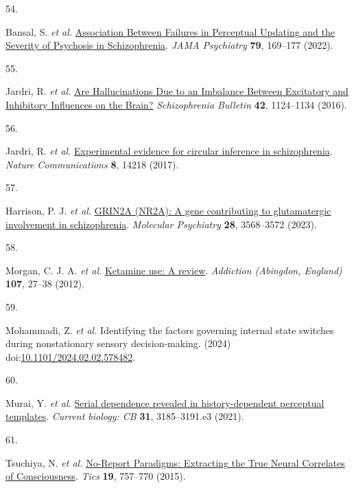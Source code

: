 \documentclass[
]{article}
\newlength{\cslhangindent}
\newlength{\csllabelwidth}
\newenvironment{CSLReferences}[2] %
 {\begin{list}{}{%
  \setlength{\itemindent}{0pt}
  \setlength{\leftmargin}{0pt}
  \setlength{\parsep}{0pt}
  \ifodd #1
   \setlength{\leftmargin}{\cslhangindent}
   \setlength{\itemindent}{-1\cslhangindent}
  \fi
  \setlength{\itemsep}{#2\baselineskip}}}
 {\end{list}}
\newcommand{\CSLLeftMargin}[1]{\parbox[t]{\csllabelwidth}{\strut#1\strut}}
\newcommand{\CSLRightInline}[1]{\parbox[t]{\linewidth - \csllabelwidth}{\strut#1\strut}}
\begin{document}
\begin{CSLReferences}{0}{0}
\CSLLeftMargin{54. }%
\CSLRightInline{Bansal, S. \emph{et al.}
\href{https://doi.org/10.1001/jamapsychiatry.2021.3482}{Association
{Between} {Failures} in {Perceptual} {Updating} and the {Severity} of
{Psychosis} in {Schizophrenia}}. \emph{JAMA Psychiatry} \textbf{79},
169--177 (2022).}

\CSLLeftMargin{55. }%
\CSLRightInline{Jardri, R. \emph{et al.}
\href{https://doi.org/10.1093/schbul/sbw075}{Are {Hallucinations} {Due}
to an {Imbalance} {Between} {Excitatory} and {Inhibitory} {Influences}
on the {Brain}?} \emph{Schizophrenia Bulletin} \textbf{42}, 1124--1134
(2016).}

\CSLLeftMargin{56. }%
\CSLRightInline{Jardri, R. \emph{et al.}
\href{https://doi.org/10.1038/ncomms14218}{Experimental evidence for
circular inference in schizophrenia}. \emph{Nature Communications}
\textbf{8}, 14218 (2017).}

\CSLLeftMargin{57. }%
\CSLRightInline{Harrison, P. J. \emph{et al.}
\href{https://doi.org/10.1038/s41380-023-02265-y}{{GRIN2A} ({NR2A}): A
gene contributing to glutamatergic involvement in schizophrenia}.
\emph{Molecular Psychiatry} \textbf{28}, 3568--3572 (2023).}

\CSLLeftMargin{58. }%
\CSLRightInline{Morgan, C. J. A. \emph{et al.}
\href{https://doi.org/10.1111/j.1360-0443.2011.03576.x}{Ketamine use: A
review}. \emph{Addiction (Abingdon, England)} \textbf{107}, 27--38
(2012).}

\CSLLeftMargin{59. }%
\CSLRightInline{Mohammadi, Z. \emph{et al.} Identifying the factors
governing internal state switches during nonstationary sensory
decision-making. (2024)
doi:\href{https://doi.org/10.1101/2024.02.02.578482}{10.1101/2024.02.02.578482}.}

\CSLLeftMargin{60. }%
\CSLRightInline{Murai, Y. \emph{et al.}
\href{https://doi.org/10.1016/j.cub.2021.05.006}{Serial dependence
revealed in history-dependent perceptual templates}. \emph{Current
biology: CB} \textbf{31}, 3185--3191.e3 (2021).}

\CSLLeftMargin{61. }%
\CSLRightInline{Tsuchiya, N. \emph{et al.}
\href{https://doi.org/10.1016/j.tics.2015.10.002}{No-{Report}
{Paradigms}: {Extracting} the {True} {Neural} {Correlates} of
{Consciousness}}. \emph{Tics} \textbf{19}, 757--770 (2015).}


\end{CSLReferences}
\end{document}
